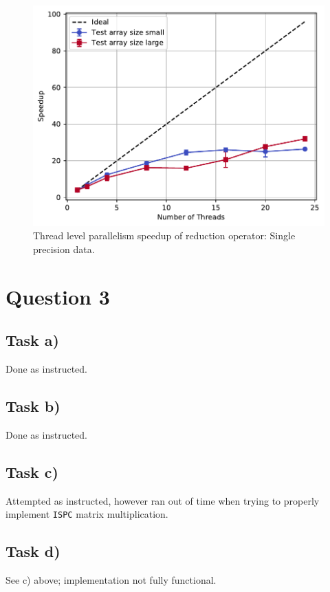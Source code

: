 \documentclass[11pt,a4paper]{article}
\begin{document}
\begin{figure}[ht]
\begin{center}
\includegraphics[scale=0.5]{4-way.pdf} 
\end{center}
\caption{Thread level parallelism speedup of reduction operator: Single precision data.}
\label{fig2}
\end{figure}
    



\section{Question 3}


\subsection{Task a)}


Done as instructed.

\subsection{Task b)}

Done as instructed.
\subsection{Task c)}

Attempted as instructed, however ran out of time when trying to properly implement
\texttt{ISPC} matrix multiplication.

\subsection{Task d)}
See c) above; implementation not fully functional.
\end{document}
